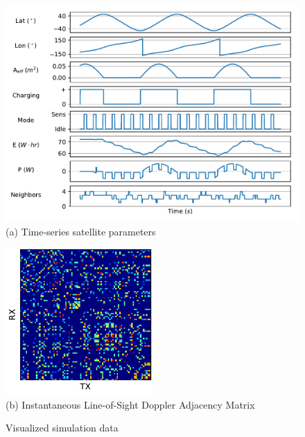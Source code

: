 \documentclass[conference]{IEEEtran}
\begin{document}
\begin{figure}[t]
  \begin{minipage}[b]{\linewidth}
    \begin{center}
      \includegraphics[width=\textwidth]{images/param_plot.pdf} \\
      {\footnotesize(a) Time-series satellite parameters}
    \end{center}
    \medskip
  \end{minipage}
  \begin{minipage}[b]{\linewidth}
    \begin{center}
      \includegraphics[width=0.5\textwidth]{images/weighted_plot.pdf} \\
      {\footnotesize(b) Instantaneous Line-of-Sight Doppler Adjacency Matrix}
    \end{center}
  \end{minipage}
  \caption{Visualized simulation data}
  \label{fig:processing}
\end{figure}
\end{document}
